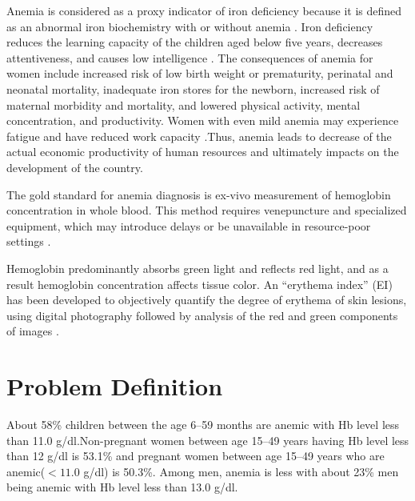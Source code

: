 \documentclass[peerreview]{IEEEtran}
\begin{document}
Anemia is considered as a proxy indicator of iron deficiency \cite{pasricha2010determinants} because it is defined as an 
abnormal iron biochemistry with or without anemia \cite{kotecha2011nutritional}. 
Iron deficiency reduces the learning capacity of the children aged 
below five years, decreases attentiveness, and causes low intelligence \cite{singh2014}. The consequences of anemia for 
women include increased risk of low birth weight or prematurity, perinatal and neonatal mortality, inadequate iron stores 
for the newborn, increased risk of maternal morbidity and mortality, and lowered physical activity, mental concentration, 
and productivity. Women with even mild anemia may experience fatigue and have reduced work capacity 
\cite{bentley2003burden}.Thus, anemia leads to decrease of the actual economic productivity of human resources and 
ultimately impacts on the development of the country\cite{singh2014,bentley2003burden}.

The gold standard for anemia diagnosis is ex-vivo measurement of hemoglobin concentration in whole blood. This method 
requires venepuncture and specialized equipment, which may introduce delays or be unavailable in resource-poor settings
\cite{10.1371/journal.pone.0153286}.

Hemoglobin predominantly absorbs green light and reflects red light, and as a result hemoglobin concentration affects 
tissue color\cite{setaro2002quantification}. An ``erythema index'' (EI) has been developed to objectively quantify the degree of erythema of skin 
lesions, using digital photography followed by analysis of the red and green components of images 
\cite{yamamoto2008derivation,setaro2002quantification,10.1371/journal.pone.0153286}.

\section{Problem Definition}
About 58\% children between the age 6--59 months are anemic with Hb level less than 11.0 g/dl.Non-pregnant women between age
15--49 years having Hb level less than 12 g/dl is 53.1\% and pregnant women between age 15--49 years who are anemic($<11.0$ g/dl)
is 50.3\%. Among men, anemia is less with about 23\% men being anemic with Hb level less than 13.0 g/dl\cite{nfhs-4}.
\end{document}
